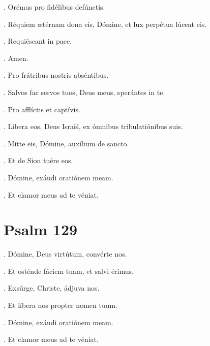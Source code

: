 \begin{versicles}
\Vbar. Orémus pro fidélibus defúnctis.

\Rbar. Réquiem ætérnam dona eis, Dómine, et lux perpétua lúceat eis.
\end{versicles}

\begin{versicles}
\Vbar. Requiéscant in pace.

\Rbar. Amen.
\end{versicles}

\begin{versicles}
\Vbar. Pro frátribus nostris abséntibus.

\Rbar. Salvos fac servos tuos, Deus meus, sperántes in te.
\end{versicles}

\begin{versicles}
\Vbar. Pro afflíctis et captívis.

\Rbar. Líbera eos, Deus Israël, ex ómnibus tribulatiónibus suis.
\end{versicles}

\begin{versicles}
\Vbar. Mitte eis, Dómine, auxílium de sancto.

\Rbar. Et de Sion tuére eos.
\end{versicles}

\begin{versicles}
\Vbar. Dómine, exáudi oratiónem meam.

\Rbar. Et clamor meus ad te véniat.
\end{versicles}

\section*{Psalm 129}



\begin{versicles}
\Vbar. Dómine, Deus virtútum, convérte nos.

\Rbar. Et osténde fáciem tuam, et salvi érimus.
\end{versicles}

\begin{versicles}
\Vbar. Exsúrge, Christe, ádjuva nos.

\Rbar. Et líbera nos propter nomen tuum.
\end{versicles}

\begin{versicles}
\Vbar. Dómine, exáudi oratiónem meam.

\Rbar. Et clamor meus ad te véniat.
\end{versicles}